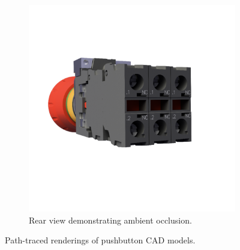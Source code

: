 \begin{figure}[H]
\begin{subfigure}[t]{0.38\textwidth}
        \includegraphics[width=\textwidth]{resources/demo-ambient-occlusion.png}
        \caption{Rear view demonstrating ambient occlusion.}
        \label{fig:demo-ambient-occlusion}
    \end{subfigure}
    \hspace*{1cm}
    \caption{Path-traced renderings of pushbutton \gls{CAD} models.}
    \label{fig:rendering-showcase}
\end{figure}
